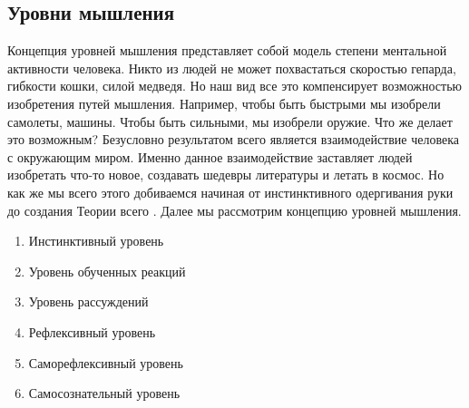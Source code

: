 \clearpage
\subsection{Уровни мышления}
Концепция уровней мышления представляет собой модель степени ментальной активности человека. Никто из людей не может похвастаться скоростью гепарда, гибкости кошки, силой медведя. Но наш вид все это компенсирует возможностью изобретения путей мышления. Например, чтобы быть быстрыми мы изобрели самолеты, машины. Чтобы быть сильными, мы изобрели оружие. Что же делает это возможным? Безусловно результатом всего является взаимодействие человека с окружающим миром. Именно данное взаимодействие заставляет людей изобретать что-то новое, создавать шедевры литературы и летать в космос. Но как же мы всего этого добиваемся начиная от инстинктивного одергивания руки до создания Теории всего \cite{Hawking}. Далее мы рассмотрим концепцию уровней мышления.
\begin{enumerate}
	\item Инстинктивный уровень
	\item Уровень обученных реакций
	\item Уровень рассуждений
	\item Рефлексивный уровень
	\item Саморефлексивный уровень
	\item Самосознательный уровень
\end{enumerate}

